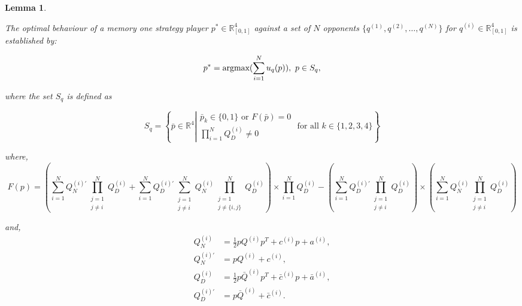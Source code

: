\documentclass[10pt]{article}
\newcommand{\R}{\mathbb{R}}
\newtheorem{lemma}[theorem]{Lemma}
\begin{document}
\begin{lemma}\label{lemma:memone_group_best_response}

    The optimal behaviour of a memory one strategy player
    \(p^* \in \R_{[0, 1]} ^ 4\)
    against a set of \(N\) opponents \(\{q^{(1)}, q^{(2)}, \dots, q^{(N)} \}\)
    for \(q^{(i)} \in \R_{[0, 1]} ^ 4\) is established by:

    \[p^* = \textnormal{argmax}(\sum\limits_{i=1} ^ N  u_q(p)), \ p \in S_q,\]

    where the set \(S_q\) is defined as

    \[
        S_q =
        \left\{\bar{p} \in \mathbb{R} ^ 4 \left |
            \begin{array}{c}
                \bar{p}_k \in \{0, 1\} \text{ or } F(\bar{p}) = 0\\
                \prod\limits_{i=1} ^ N Q_{D}^{(i)} \neq 0
            \end{array}
            \text{ for all } k \in \{1, 2, 3, 4 \} \right.
        \right\}
    \]


    where,
    \begin{equation}\label{eq:group_derivative_numerator_condition}
    F(p)=(\sum\limits_{i=1} ^ {N} Q_{N}^{(i)'} \prod_{\substack{j=1 \\ j \neq i}} ^ N Q_{D}^{(i)}
     + \sum\limits_{i=1} ^ {N} Q_{D}^{(i)'} \sum_{\substack{j=1 \\ j \neq i}} ^ {N} Q_{N}^{(i)}
    \prod_{\substack{j=1 \\ j \neq \{i, j\}}} ^ N Q_{D}^{(i)}) \times
    \prod\limits_{i=1} ^ N Q_{D}^{(i)} - (\sum\limits_{i=1} ^ {N} Q_{D}^{(i)'}
    \prod_{\substack{j=1 \\ j \neq i}} ^ N Q_{D}^{(i)}) \times
    (\sum\limits_{i=1} ^ {N} Q_{N}^{(i)} \prod_{\substack{j=1 \\ j \neq i}} ^ N Q_{D}^{(i)})
    \end{equation}

    and,
    \begin{align*}
        Q_{N}^{(i) } & = \frac{1}{2} pQ^{(i)} p^T + c^{(i)} p + a^ {(i)}, \\
        Q_{N}^{(i)'} & =  pQ^{(i)} + c^{(i)}, \\
        Q_{D}^{(i) } & = \frac{1}{2} p\bar{Q}^{(i)} p^T + \bar{c}^{(i)} p + \bar{a}^ {(i)}, \\
        Q_{D}^{(i)'} & =  p\bar{Q}^{(i)} + \bar{c}^{(i)}. \\
    \end{align*}
\end{lemma}
\end{document}
